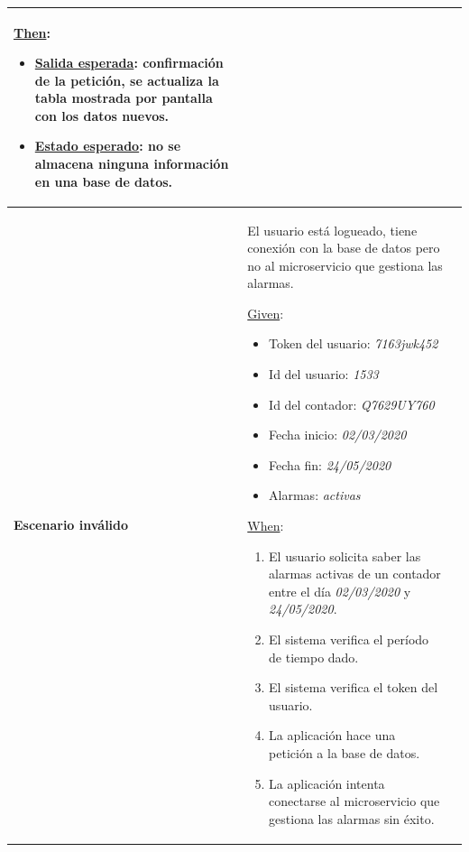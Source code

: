 \documentclass[pdftex,11pt,a4paper]{book}
\begin{document}
\begin{center}
\begin{longtable}{|>{\centering\arraybackslash}X m{2cm}|m{12cm}|}
\begin{enumerate}
\end{enumerate}
\break

\underline{Then}:
\vspace{-3mm}
\begin{itemize}
\addtolength{\itemsep}{-3mm}
\item \underline{Salida esperada}: confirmación de la petición, se actualiza la tabla mostrada por pantalla con los datos nuevos.
\item \underline{Estado esperado}: no se almacena ninguna información en una base de datos.
\end{itemize}

\\ \hline
\textbf{Escenario inválido} & {\raggedright El usuario está logueado, tiene conexión con la base de datos pero no al microservicio que gestiona las alarmas.

\par}
\vspace{2mm}
\break

\underline{Given}:
\vspace{-3mm}
\begin{itemize}
\addtolength{\itemsep}{-3mm}
\item Token del usuario: \textit{7163jwk452}
\item Id del usuario: \textit{1533}
\item Id del contador: \textit{Q7629UY760}
\item Fecha inicio: \textit{02/03/2020}
\item Fecha fin: \textit{24/05/2020}
\item Alarmas: \textit{activas}

\end{itemize}

\underline{When}:
\begin{enumerate}
\vspace{-3mm}
\addtolength{\itemsep}{-3mm}
\item El usuario solicita saber las alarmas activas de un contador entre el día \textit{02/03/2020} y \textit{24/05/2020}.
\item El sistema verifica el período de tiempo dado.
\item El sistema verifica el token del usuario.
\item La aplicación hace una petición a la base de datos. 
\item La aplicación intenta conectarse al microservicio que gestiona las alarmas sin éxito.


\end{enumerate}
\end{longtable}
\end{center}
\end{document}
